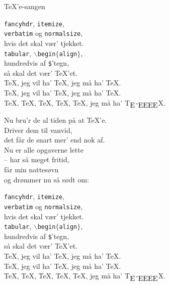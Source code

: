 \begin{song}{\TeX'e-sangen}
  \begin{SBChorus}
\texttt{fancyhdr}, \texttt{itemize},\\
\texttt{verbatim} og \texttt{normalsize},\\
hvis det skal vær' tjekket.\\
\texttt{tabular}, \texttt{$\backslash$begin$\{$align$\}$},\\
hundredvis af \texttt{\$}'tegn,\\
så skal det vær' \TeX'et.\\
\TeX, jeg vil ha' \TeX, jeg må ha' \TeX.\\
\TeX, jeg vil ha' \TeX, jeg må ha' \TeX.\\
\TeX, \TeX, \TeX, \TeX, \TeX, jeg må ha' T\!$_{\text{\normalsize E}}$-$_{\text{\normalsize EEEE}}$\!X.
  \end{SBChorus}


  \begin{SBVerse}
Nu bru'r de al tiden på at \TeX'e.\\
Driver dem til vanvid,\\
det får de snart mer' end nok af.\\
Nu er alle opgaverne lette\\
-- har så meget fritid,\\
får min nattesøvn\\
og drømmer nu så sødt om:
  \end{SBVerse}

  \begin{SBChorus}
\texttt{fancyhdr}, \texttt{itemize},\\
\texttt{verbatim} og \texttt{normalsize},\\
hvis det skal vær' tjekket.\\
\texttt{tabular}, \texttt{$\backslash$begin$\{$align$\}$},\\
hundredvis af \texttt{\$}'tegn,\\
så skal det vær' \TeX'et.\\
\TeX, jeg vil ha' \TeX, jeg må ha' \TeX.\\
\TeX, jeg vil ha' \TeX, jeg må ha' \TeX.\\
\TeX, \TeX, \TeX, \TeX, \TeX, jeg må ha' T\!$_{\text{\normalsize E}}$-$_{\text{\normalsize EEEE}}$\!X.
  \end{SBChorus}


\end{song}
